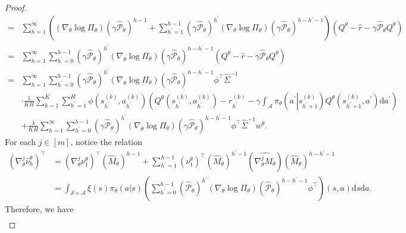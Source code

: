 \documentclass{article}
\numberwithin{equation}{section}
\begin{document}
\begin{proof}
\begin{align*}
    =&\sum_{h=1}^\infty\left(\left(\nabla_\theta\log\Pi_\theta\right)\left(\gamma\widehat{\mathcal{P}}_\theta\right)^{h-1}+\sum_{h^\prime=1}^{h-1}\left(\gamma\widehat{\mathcal{P}}_\theta\right)^{h^\prime}\left(\nabla_\theta\log\Pi_\theta\right)\left(\gamma\widehat{\mathcal{P}}_\theta\right)^{h-h^\prime-1}\right)\left(Q^\theta-\widehat{r}-\gamma\widehat{\mathcal{P}}_\theta Q^\theta\right)\\
    =&\sum_{h=1}^\infty\sum_{h^\prime=0}^{h-1}\left(\gamma\widehat{\mathcal{P}}_\theta\right)^{h^\prime}\left(\nabla_\theta\log\Pi_\theta\right)\left(\gamma\widehat{\mathcal{P}}_\theta\right)^{h-h^\prime-1}\left(Q^\theta-\widehat{r}-\gamma\widehat{\mathcal{P}}_\theta Q^\theta\right)\\
    =&\sum_{h=1}^\infty\sum_{h^\prime=0}^{h-1}\left(\gamma\widehat{\mathcal{P}}_\theta\right)^{h^\prime}\left(\nabla_\theta\log\Pi_\theta\right)\left(\gamma\widehat{\mathcal{P}}_\theta\right)^{h-h^\prime-1}\phi^\top\widehat{\Sigma}^{-1}\\
    &\cdot\frac{1}{KH}\sum_{k=1}^K\sum_{h^\prime=1}^H\phi\left(s_{h^\prime}^{(k)},a_{h^\prime}^{(k)}\right)\left(Q^\theta\left(s_{h^\prime}^{(k)},a_{h^\prime}^{(k)}\right)-r_{h^\prime}^{(k)}-\gamma\int_{\mathcal{A}}\pi_\theta\left(a^\prime\left\vert s_{h^\prime+1}^{(k)}\right.\right)Q^\theta\left(s_{h^\prime+1}^{(k)},a^\prime\right)\mathrm{d}a^\prime\right)\\
    &+\frac{\lambda}{KH}\sum_{h=1}^\infty\sum_{h^\prime=0}^{h-1}\left(\gamma\widehat{\mathcal{P}}_\theta\right)^{h^\prime}\left(\nabla_\theta\log\Pi_\theta\right)\left(\gamma\widehat{\mathcal{P}}_\theta\right)^{h-h^\prime-1}\phi^\top\widehat{\Sigma}^{-1}w^\theta.
\end{align*}
For each $j\in[m]$, notice the relation
\begin{align*}
    \left(\nabla_\theta^j\widehat{\nu}_h^\theta\right)^\top&=\left(\nabla_\theta^j\nu_1^\theta\right)^\top\left(\widehat{M}_\theta\right)^{h-1}+\sum_{h^\prime=1}^{h-1}\left(\nu_1^\theta\right)^\top\left(\widehat{M}_\theta\right)^{h^\prime-1}\left(\widehat{\nabla_\theta^j M_\theta}\right)\left(\widehat{M}_\theta\right)^{h-h^\prime-1}\\
    &=\int_{\mathcal{S}\times\mathcal{A}}\xi(s)\pi_\theta(a\vert s)\left(\sum_{h^\prime=0}^{h-1}\left(\widehat{\mathcal{P}}_\theta\right)^{h^\prime}\left(\nabla_\theta\log\Pi_\theta\right)\left(\widehat{\mathcal{P}}_\theta\right)^{h-h^\prime-1}\phi^\top\right)(s,a)\mathrm{d}s\mathrm{d}a.
\end{align*} 
Therefore, we have
\begin{align}

\end{align}
\end{proof}
\end{document}
